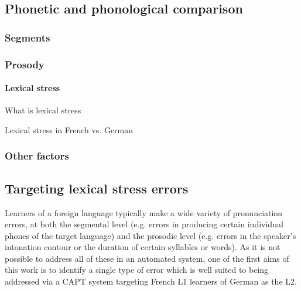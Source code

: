 
	\subsection{Phonetic and phonological comparison}
	\label{sec:CAPT4FG:comparison}
		\subsubsection{Segments}
		\subsubsection{Prosody}

			\paragraph{Lexical stress}
			
			What is lexical stress \parencite{Cutler2008}
			
			Lexical stress in French vs. German 
			\parencite{Cutler2008}		
			\parencite{Peperkamp2002,Dupoux2001,Dupoux2008}
		
		\subsubsection{Other factors}
		
	\subsection{Targeting lexical stress errors}
	\label{sec:CAPT4FG:targeting}
	Learners of a foreign language typically make a wide variety of pronunciation errors, at both the segmental level (e.g. errors in producing certain individual phones of the target language) and the prosodic level (e.g. errors in the speaker's intonation contour or the duration of certain syllables or words). As it is not possible to address all of these in an automated system, one of the first aims of this work is to identify a single type of error which is well suited to being addressed via a CAPT system targeting French L1 learners of German as the L2. 
	

